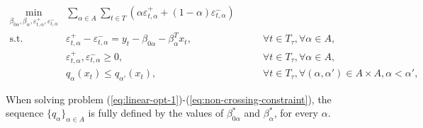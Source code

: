 \begin{eqnarray}
\label{eq:non-crossing-quantiles1}
\min_{\beta_{0\alpha},\beta_\alpha,\varepsilon_{t,\alpha}^{+}, \varepsilon_{t,\alpha}^{-}} &  \sum_{\alpha \in A} \sum_{t \in T}\left(\alpha \varepsilon_{t,\alpha}^{+}+(1-\alpha)\varepsilon_{t,\alpha}^{-}\right) & \label{eq:linear-opt-1} \\
\mbox{s.t. } & \varepsilon_{t,\alpha}^{+}-\varepsilon_{t,\alpha}^{-}=y_{t} - \beta_{0\alpha} - \beta_{\alpha}^T x_{t}, & \qquad\forall t \in T_\tau,\forall \alpha \in A,\\
& \varepsilon_{t,\alpha}^+,\varepsilon_{t,\alpha}^- \geq 0, & \qquad\forall t \in T_\tau,\forall \alpha \in A,\\ \label{eq:non-crossing-constraint}
& q_{\alpha}(x_t) \leq q_{\alpha'}(x_t), & \qquad \forall t \in T_\tau, \forall (\alpha, \alpha') \in A \times A,  \alpha < \alpha', 
\end{eqnarray}


When solving problem (\ref{eq:linear-opt-1})-(\ref{eq:non-crossing-constraint}), the sequence $\{ q_\alpha \}_{\alpha \in A}$ is fully defined by the values of $\beta^*_{0\alpha}$ and $\beta^*_\alpha$, for every $\alpha$.


